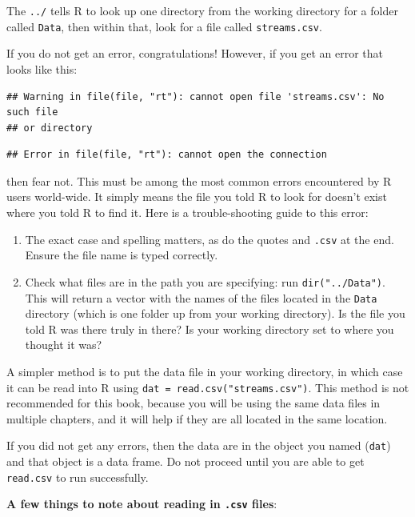 \documentclass[]{book}
\providecommand{\tightlist}{%
  \setlength{\itemsep}{0pt}\setlength{\parskip}{0pt}}
\theoremstyle{definition}
\theoremstyle{definition}
\theoremstyle{definition}
\theoremstyle{remark}
\begin{document}
The \texttt{../} tells R to look up one directory from the working
directory for a folder called \texttt{Data}, then within that, look for
a file called \texttt{streams.csv}.

If you do not get an error, congratulations! However, if you get an
error that looks like this:

\begin{verbatim}
## Warning in file(file, "rt"): cannot open file 'streams.csv': No such file
## or directory
\end{verbatim}

\begin{verbatim}
## Error in file(file, "rt"): cannot open the connection
\end{verbatim}

then fear not. This must be among the most common errors encountered by
R users world-wide. It simply means the file you told R to look for
doesn't exist where you told R to find it. Here is a trouble-shooting
guide to this error:

\begin{enumerate}
\def\labelenumi{\arabic{enumi}.}
\tightlist
\item
  The exact case and spelling matters, as do the quotes and
  \texttt{.csv} at the end. Ensure the file name is typed correctly.
\item
  Check what files are in the path you are specifying: run
  \texttt{dir("../Data")}. This will return a vector with the names of
  the files located in the \texttt{Data} directory (which is one folder
  up from your working directory). Is the file you told R was there
  truly in there? Is your working directory set to where you thought it
  was?
\end{enumerate}

A simpler method is to put the data file in your working directory, in
which case it can be read into R using
\texttt{dat\ =\ read.csv("streams.csv")}. This method is not recommended
for this book, because you will be using the same data files in multiple
chapters, and it will help if they are all located in the same location.

If you did not get any errors, then the data are in the object you named
(\texttt{dat}) and that object is a data frame. Do not proceed until you
are able to get \texttt{read.csv} to run successfully.

\textbf{A few things to note about reading in \texttt{.csv} files}:
\end{document}
